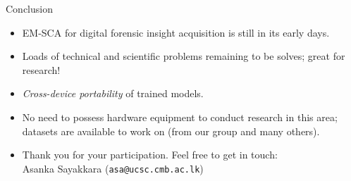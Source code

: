 \documentclass[handout]{beamer}
\begin{document}




\begin{frame}{Conclusion}

\begin{itemize}
\footnotesize
\item EM-SCA for digital forensic insight acquisition is still in its early days.
\vspace{10pt}
\item Loads of technical and scientific problems remaining to be solves; great for research!
\vspace{10pt}
\item \emph{Cross-device portability} of trained models.
\vspace{10pt}
\item No need to possess hardware equipment to conduct research in this area; datasets are available to work on (from our group and many others).
\vspace{10pt}
\item Thank you for your participation. Feel free to get in touch: \\ 
	\vspace{5pt} 
	Asanka Sayakkara (\texttt{asa@ucsc.cmb.ac.lk})
\end{itemize}

\end{frame}
\end{document}
